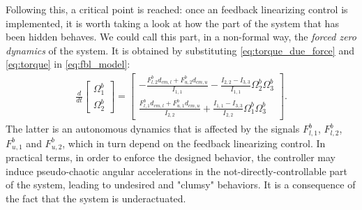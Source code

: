 Following this, a critical point is reached: once an feedback linearizing control is implemented, it is worth taking a look at how the part of the system that has been hidden behaves. We could call this part, in a non-formal way, the \textit{forced zero dynamics} of the system. It is obtained by substituting \ref{eq:torque_due_force} and \ref{eq:torque} in \ref{eq:fbl_model}:
\begin{align*}
    \frac{d}{dt}\begin{bmatrix}
        \Omega^b_1 \\
        \Omega^b_2
    \end{bmatrix}
    = 
    \begin{bmatrix}
        -\frac{F_{l,2}^b d_{cm,l} + F_{u,2}^b d_{cm,u}}{I_{1,1}} - \frac{I_{2,2}-I_{3,3}}{I_{1,1}} \Omega^b_2 \Omega^b_3 \\
        \frac{F_{l,1}^b d_{cm,l} + F_{u,1}^b d_{cm,u}}{I_{2,2}} + \frac{I_{1,1}-I_{3,3}}{I_{2,2}} \Omega^b_1 \Omega^b_3
    \end{bmatrix}.
\end{align*}
The latter is an autonomous dynamics that is affected by the signals $F_{l,1}^b$, $F_{l,2}^b$, $F_{u,1}^b$ and $F_{u,2}^b$, which in turn depend on the feedback linearizing control. In practical terms, in order to enforce the designed behavior, the controller may induce pseudo-chaotic angular accelerations in the not-directly-controllable part of the system, leading to undesired and "clumsy" behaviors. It is a consequence of the fact that the system is underactuated.


